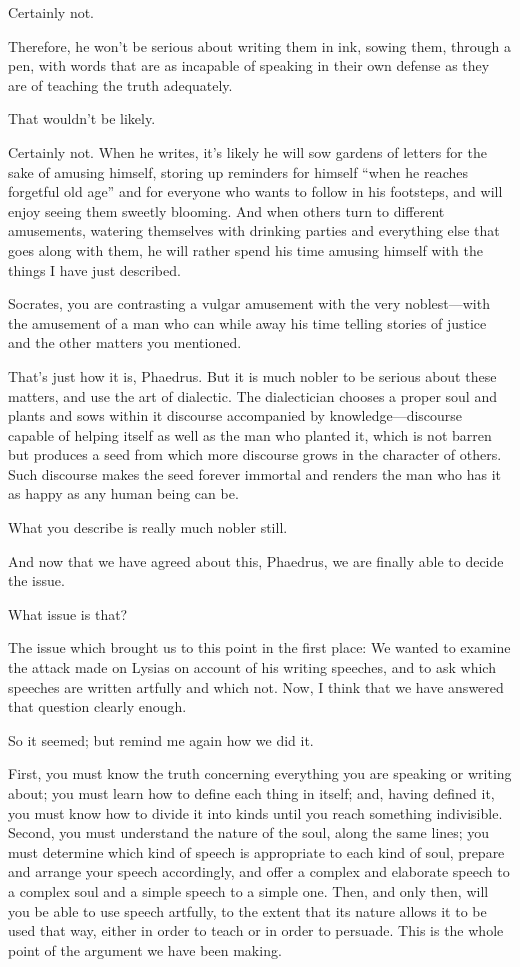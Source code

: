 \sayphaedrus Certainly not.

\saysocrates Therefore, he won't be serious about writing them in ink,
sowing them, through a pen, with words that are as incapable of speaking
in their own defense as they are of teaching the truth adequately.

\sayphaedrus That wouldn't be likely.

\saysocrates Certainly not. When he writes, it's likely he will sow gardens 
of letters for the sake of amusing himself, storing up reminders
for himself “when he reaches forgetful old age” and for everyone who
wants to follow in his footsteps, and will enjoy seeing them sweetly
blooming. And when others turn to different amusements, watering
themselves with drinking parties and everything else that goes along
with them, he will rather spend his time amusing himself with the things
I have just described.

\sayphaedrus Socrates, you are contrasting a vulgar amusement with the 
very noblest---with the amusement of a man who can while away
his time telling stories of justice and the other matters you mentioned.

\saysocrates That's just how it is, Phaedrus. But it is much nobler to be
serious about these matters, and use the art of dialectic. The
dialectician chooses a proper soul and plants and sows within it
discourse accompanied by knowledge---discourse capable of helping itself
as well as the man who planted it, which is not barren but produces a
seed from which more discourse grows in the character of
others. Such discourse makes the seed forever immortal and renders the
man who has it as happy as any human being can be.

\sayphaedrus What you describe is really much nobler still.

\saysocrates And now that we have agreed about this, Phaedrus, we are
finally able to decide the issue.

\sayphaedrus What issue is that?

\saysocrates The issue which brought us to this point in the first place:
We wanted to examine the attack made on Lysias on account of his writing speeches, and to ask which speeches are written artfully and
which not. Now, I think that we have answered that question clearly
enough.

\sayphaedrus So it seemed; but remind me again how we did it.

\saysocrates First, you must know the truth concerning everything you are
speaking or writing about; you must learn how to define each thing in
itself; and, having defined it, you must know how to divide it into
kinds until you reach something indivisible. Second, you must understand
the nature of the soul, along the same lines; you must determine which
kind of speech is appropriate to each kind of soul, prepare and
arrange your speech accordingly, and offer a complex and elaborate
speech to a complex soul and a simple speech to a simple one. Then, and
only then, will you be able to use speech artfully, to the extent that
its nature allows it to be used that way, either in order to teach or in
order to persuade. This is the whole point of the argument we have been
making.

